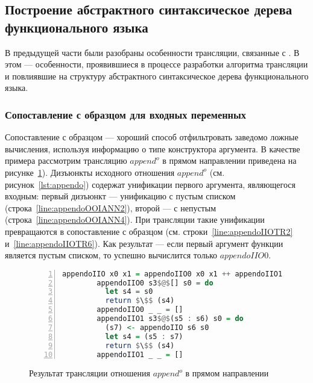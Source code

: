 \subsection{Построение абстрактного синтаксическое дерева функционального языка}

В предыдущей части были разобраны особенности трансляции, связанные с \miniKanren{}.
В этом --- особенности, проявившиеся в процессе разработки алгоритма трансляции и повлиявшие на структуру абстрактного синтаксическое дерева функционального языка.


\subsubsection{Сопоставление с образцом для входных переменных}

Сопоставление с образцом --- хороший способ отфильтровать заведомо ложные вычисления, используя информацию о типе конструктора аргумента.
В качестве примера рассмотрим трансляцию $append^o$ в прямом направлении приведена на рисунке~\ref{lst:appendoIIOTR}).
Дизъюнкты исходного отношения $append^o$ (см. рисунок~\ref{lst:appendo}) содержат унификации первого аргумента, являющегося входным: первый дизъюнкт --- унификацию с пустым списком (строка~\ref{line:appendoOOIANN2}), второй --- с непустым (строка~\ref{line:appendoOOIANN4}).
При трансляции такие унификации превращаются в сопоставление с образцом (см. строки~\ref{line:appendoIIOTR2} и~\ref{line:appendoIIOTR6}).
Как результат --- если первый аргумент функции является пустым списком, то успешно вычислится только $appendoIIO0$.

\begin{figure}[h!]
  \begin{center}
  \begin{minipage}{0.7\textwidth}
  \begin{lstlisting}[language=Haskell, frame=single, numbers=left,numberstyle=\small, firstnumber=1, escapechar=|]
        appendoIIO x0 x1 = appendoIIO0 x0 x1 ++ appendoIIO1 x0 x1
        appendoIIO0 s3$@$[] s0 = do                                  |\label{line:appendoIIOTR2}|
          let s4 = s0
          return $\$$ (s4)
        appendoIIO0 _ _ = []                                         |\label{line:appendoIIOTR5}|
        appendoIIO1 s3$@$(s5 : s6) s0 = do                           |\label{line:appendoIIOTR6}|
          (s7) <- appendoIIO s6 s0
          let s4 = (s5 : s7)
          return $\$$ (s4)
        appendoIIO1 _ _ = []                                         |\label{line:appendoIIOTR10}|
    \end{lstlisting}
  \end{minipage}
  \end{center}
  \caption{Результат трансляции отношения $append^o$ в прямом направлении}
  \label{lst:appendoIIOTR}
\end{figure}

